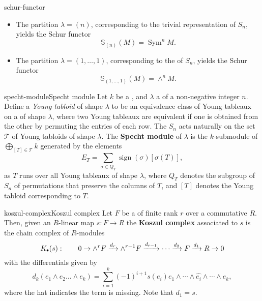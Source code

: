\begin{example}{schur-functor}
    \begin{itemize}
        \item The partition $\lambda = (n)$, corresponding to the trivial representation of $S_n$, yields the Schur functor
        \[ \mathbb{S}_{(n)}(M) = \operatorname{Sym}^n M . \]
        \item The partition $\lambda = (1, \ldots, 1)$, corresponding to the  of $S_n$, yields the Schur functor
        \[ \mathbb{S}_{(1, \ldots, 1)}(M) = \wedge^n M . \]
    \end{itemize}    
\end{example}

\begin{topic}{specht-module}{Specht module}
    Let $k$ be a , and $\lambda$ a  of a non-negative integer $n$.
    Define a \textit{Young tabloid} of shape $\lambda$ to be an equivalence class of Young tableaux on a  of shape $\lambda$, where two Young tableaux are equivalent if one is obtained from the other by permuting the entries of each row.
    The  $S_n$ acts naturally on the set $\mathcal{T}$ of Young tabloids of shape $\lambda$.
    The \textbf{Specht module} of $\lambda$ is the $k$-submodule of $\bigoplus_{[T] \in \mathcal{T}} k$ generated by the elements
    \[ E_T = \sum_{\sigma \in Q_T} \operatorname{sign}(\sigma) [\sigma(T)] , \]
    as $T$ runs over all Young tableaux of shape $\lambda$, where $Q_T$ denotes the subgroup of $S_n$ of permutations that preserve the columns of $T$, and $[T]$ denotes the Young tabloid corresponding to $T$.
\end{topic}

\begin{topic}{koszul-complex}{Koszul complex}
    Let $F$ be a  of finite rank $r$ over a commutative  $R$. Then, given an $R$-linear map $s : F \to R$ the \textbf{Koszul complex} associated to $s$ is the chain complex of $R$-modules
    \[ K_\bdot(s) : \qquad 0 \to \wedge^r F \xrightarrow{d_r} \wedge^{r - 1} F \xrightarrow{d_{r - 1}} \cdots \xrightarrow{d_2} F \xrightarrow{d_1} R \to 0 \]
    with the differentials given by
    \[ d_k(e_1 \wedge e_2 \ldots \wedge e_k) = \sum_{i = 1}^{k} (-1)^{i + 1} s(e_i) e_1 \wedge \cdots \wedge \hat{e_i} \wedge \cdots \wedge e_k , \]
    where the hat indicates the term is missing. Note that $d_1 = s$.
\end{topic}

